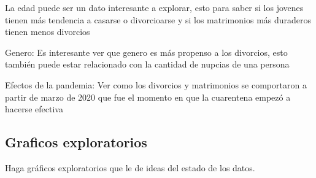 \documentclass[
]{article}
\begin{document}
La edad puede ser un dato interesante a explorar, esto para saber si los
jovenes tienen más tendencia a casarse o divorcioarse y si los
matrimonios más duraderos tienen menos divorcios

Genero: Es interesante ver que genero es más propenso a los divorcios,
esto también puede estar relacionado con la cantidad de nupcias de una
persona

Efectos de la pandemia: Ver como los divorcios y matrimonios se
comportaron a partir de marzo de 2020 que fue el momento en que la
cuarentena empezó a hacerse efectiva

\hypertarget{graficos-exploratorios}{%
\subsection{Graficos exploratorios}\label{graficos-exploratorios}}

Haga gráficos exploratorios que le de ideas del estado de los datos.
\end{document}
